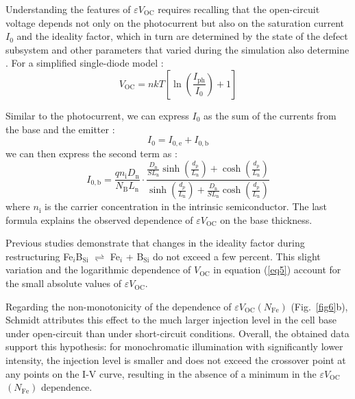 \documentclass[a4paper,fleqn]{cas-sc}
\begin{document}
Understanding the features of $\varepsilon V_\mathrm{OC}$ requires recalling that the open-circuit voltage depends not only on the photocurrent but also on the saturation current $I_\mathrm{0}$ and the ideality factor, which in turn are determined by the state of the defect subsystem and other parameters that varied during the simulation also determine \cite{Olikh2019SM,YangHandbookPVSi}. For a simplified single-diode model \cite{YangHandbookPVSi}:
\begin{equation}
\label{eq5}
     V_\mathrm{OC} = nkT\left[ {\ln\left( {\frac{I_\mathrm{ph}}{I_\mathrm{0}}} \right)+1} \right]
\end{equation}

Similar to the photocurrent, we can express $I_\mathrm{0}$ as the sum of the currents from the base and the emitter \cite{Markvart}:
\begin{equation}
\label{eq6}
     I_\mathrm{0} = I_\mathrm{0,e}+I_\mathrm{0,b}
\end{equation}
we can then express the second term as \cite{Goetzberger1998}:
\begin{equation}
\label{eq7}
     I_\mathrm{0,b}=\frac{qn_\mathrm{i}D_\mathrm{n}}{N_\mathrm{B}L_\mathrm{n}}\cdot\frac{\frac{D_\mathrm{n}}{SL_\mathrm{n}}\sinh\left( \frac{d_p}{L_\mathrm{n}} \right)+\cosh\left( \frac{d_p}{L_\mathrm{n}} \right)}{\sinh\left( \frac{d_p}{L_\mathrm{n}} \right)+\frac{D_\mathrm{n}}{SL_\mathrm{n}}\cosh\left( \frac{d_p}{L_\mathrm{n}} \right)}
\end{equation}
where $n_\mathrm{i}$ is the carrier concentration in the intrinsic semiconductor. The last formula explains the observed dependence of $\varepsilon V_\mathrm{OC}$ on the base thickness.

Previous studies \cite{Olikh2022PPV,Olikh2019SM} demonstrate that changes in the ideality factor during restructuring Fe$_i$B$_\mathrm{Si}$ $\rightleftharpoons$ Fe$_i$ + B$_\mathrm{Si}$ do not exceed a few percent. This slight variation and the logarithmic dependence of $V_\mathrm{OC}$ in equation (\ref{eq5}) account for the small absolute values of $\varepsilon V_\mathrm{OC}$.

Regarding the non-monotonicity of the dependence of $\varepsilon V_\mathrm{OC}$$\left(N_\mathrm{Fe}\right)$ (Fig.~\ref{fig6}b), Schmidt \cite{FeB:Schmidt}  attributes this effect to the much larger injection level in the cell base under open-circuit than under short-circuit conditions. Overall, the obtained data support this hypothesis: for monochromatic illumination with significantly lower intensity, the injection level is smaller and does not exceed the crossover point \cite{FeB:Schmidt} at any points on the I-V curve, resulting in the absence of a minimum in the $\varepsilon V_\mathrm{OC}$$\left(N_\mathrm{Fe}\right)$ dependence.
\end{document}
